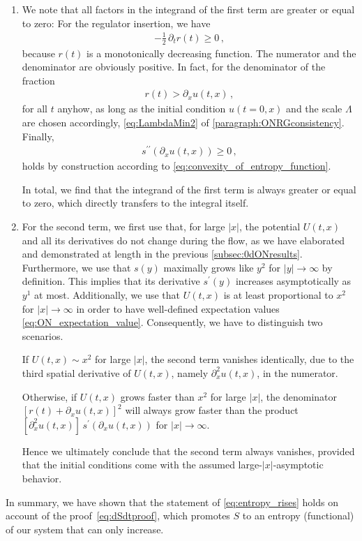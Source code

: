 	\begin{enumerate}
		\item	We note that all factors in the integrand of the first term are greater or equal to zero: For the regulator insertion, we have 
			\begin{align}
				- \tfrac{1}{2} \, \partial_t r ( t ) \geq 0 \, ,
			\end{align}
		because $r ( t )$ is a monotonically decreasing function. The numerator and the denominator are obviously positive. In fact, for the denominator of the fraction
			\begin{align}
				r ( t ) > \partial_x u ( t, x ) \, ,
			\end{align}
		for all $t$ anyhow, as long as the initial condition $u(t=0,x)$ and the \uv{} scale $\Lambda$ are chosen accordingly, \cf{} \cref{eq:LambdaMin2} of \cref{paragraph:ONRGconsistency}. Finally,
			\begin{align}
				s^{\prime\prime} ( \partial_x u ( t, x ) ) \geq 0 \, ,
			\end{align}
		holds by construction according to \cref{eq:convexity_of_entropy_function}.
		
		In total, we find that the integrand of the first term is always greater or equal to zero, which directly transfers to the integral itself.
		
		\item	For the second term, we first use that, for large $| x |$, the potential $U ( t, x )$ and all its derivatives do not change during the \frg{} flow, as we have elaborated and demonstrated at length in the previous \cref{subsec:0dONresults}.
		Furthermore, we use that $s ( y )$ maximally grows like $y^2$ for $|y| \rightarrow \infty$ by definition. 
		This implies that its derivative $s^\prime ( y )$ increases asymptotically as $y^1$ at most. 
		Additionally, we use that $U ( t, x )$ is at least proportional to $x^2$ for $|x| \rightarrow \infty$ in order to have well-defined expectation values \eqref{eq:ON_expectation_value}. Consequently, we have to distinguish two scenarios.
		
		If $U ( t, x ) \sim x^2$ for large $|x|$, the second term vanishes identically, due to the third spatial derivative of $U ( t, x )$, namely $\partial_x^2 u ( t, x )$, in the numerator. 
		
		Otherwise, if $U ( t, x )$ grows faster than $x^2$ for large $|x|$, the denominator $[ r ( t ) + \partial_x u ( t, x ) ]^2$ will always grow faster than the product $[\partial_x^2 u ( t, x )] \, s^\prime ( \partial_x u ( t, x ) )$ for $|x| \rightarrow \infty$.
		
		Hence we ultimately conclude that the second term always vanishes, provided that the initial conditions come with the assumed large-$|x|$-asymptotic behavior.
	\end{enumerate}
In summary, we have shown that the statement of \cref{eq:entropy_rises} holds on account of the proof~\eqref{eq:dSdtproof}, which promotes $S$ to an entropy (functional) of our system that can only increase.\bigskip

